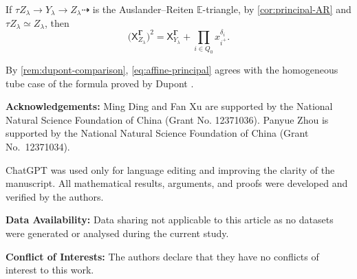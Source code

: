 \documentclass[11pt,reqno]{article}
\numberwithin{equation}{section}
\theoremstyle{definition}
\newcommand{\E}{\mathbb E}
\newcommand{\X}{\mathsf X}
\begin{document}
If $\tau Z_\lambda\to Y_\lambda\to Z_\lambda\dashrightarrow$ is the Auslander--Reiten $\E$-triangle, by \cref{cor:principal-AR} and $\tau Z_\lambda\simeq Z_\lambda$, then
\begin{equation}\label{eq:affine-principal}
 \bigl(\X^{\boldsymbol\Gamma}_{Z_\lambda}\bigr)^2
 =\X^{\boldsymbol\Gamma}_{Y_\lambda}+\prod_{i\in Q_0}x_{i^+}^{\delta_i}.
\end{equation}


By \cref{rem:dupont-comparison}, \eqref{eq:affine-principal} agrees with the homogeneous tube case of the formula proved by Dupont \cite[Proposition~2.2]{DupontCoefficients}.

\medskip
\hspace{-5.5mm}\textbf{Acknowledgements:} Ming Ding and Fan Xu are supported by the National Natural Science Foundation of China (Grant No. 12371036). Panyue Zhou is supported by the National Natural Science Foundation of China (Grant No.~12371034).
\newpage



\hspace{-5.5mm}{\bf Statement on AI:}\hspace{2mm} ChatGPT was used only for language editing and improving the clarity of the manuscript. All mathematical results, arguments, and proofs were developed and verified by the authors.
\vspace{3mm}

\hspace{-5.5mm}\textbf{Data Availability:}\hspace{2mm} Data sharing not applicable to this article as no datasets were generated or analysed during
the current study.
\vspace{3mm}

\hspace{-5.5mm}\textbf{Conflict of Interests:}\hspace{2mm} The authors declare that they have no conflicts of interest to this work.
\end{document}
